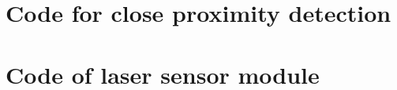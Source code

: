 \section{Code for close proximity detection}

\pagebreak
\section{Code of laser sensor module}





